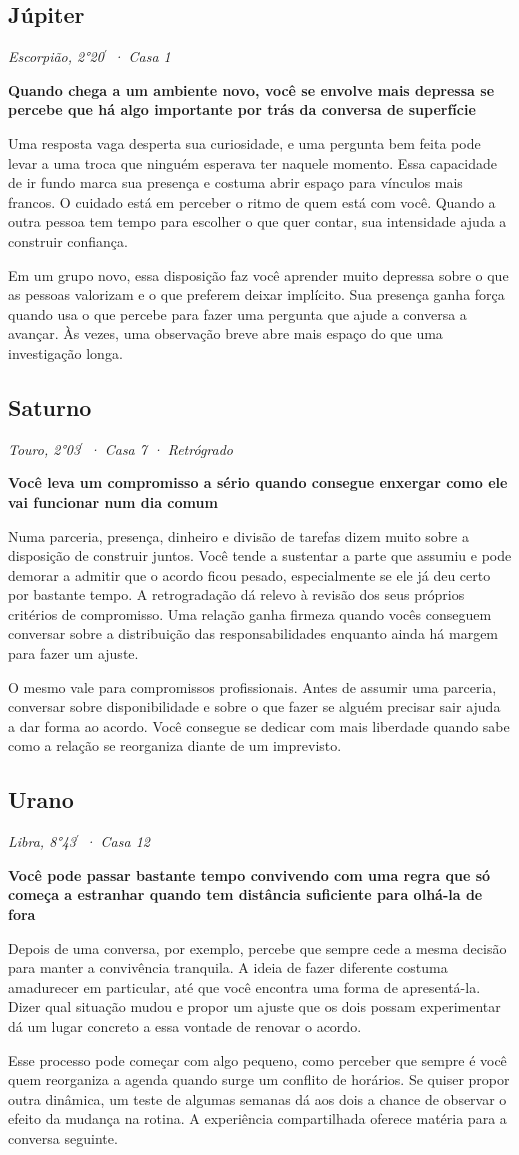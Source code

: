 \documentclass[11pt,a4paper]{article}
\newcommand{\leitura}[3]{\subsection{#1}\textit{#2}\par #3}
\newcommand{\subtituloleitura}[1]{\textbf{#1}\par\nopagebreak[4]}
\begin{document}
\leitura{Júpiter}{Escorpião, 2°20\ensuremath{^{\prime}} · Casa 1}{
\subtituloleitura{Quando chega a um ambiente novo, você se envolve mais depressa se percebe que há algo importante por trás da conversa de superfície} Uma resposta vaga desperta sua curiosidade, e uma pergunta bem feita pode levar a uma troca que ninguém esperava ter naquele momento. Essa capacidade de ir fundo marca sua presença e costuma abrir espaço para vínculos mais francos. O cuidado está em perceber o ritmo de quem está com você. Quando a outra pessoa tem tempo para escolher o que quer contar, sua intensidade ajuda a construir confiança.

Em um grupo novo, essa disposição faz você aprender muito depressa sobre o que as pessoas valorizam e o que preferem deixar implícito. Sua presença ganha força quando usa o que percebe para fazer uma pergunta que ajude a conversa a avançar. Às vezes, uma observação breve abre mais espaço do que uma investigação longa.
}

\leitura{Saturno}{Touro, 2°03\ensuremath{^{\prime}} · Casa 7 · Retrógrado}{
\subtituloleitura{Você leva um compromisso a sério quando consegue enxergar como ele vai funcionar num dia comum} Numa parceria, presença, dinheiro e divisão de tarefas dizem muito sobre a disposição de construir juntos. Você tende a sustentar a parte que assumiu e pode demorar a admitir que o acordo ficou pesado, especialmente se ele já deu certo por bastante tempo. A retrogradação dá relevo à revisão dos seus próprios critérios de compromisso. Uma relação ganha firmeza quando vocês conseguem conversar sobre a distribuição das responsabilidades enquanto ainda há margem para fazer um ajuste.

O mesmo vale para compromissos profissionais. Antes de assumir uma parceria, conversar sobre disponibilidade e sobre o que fazer se alguém precisar sair ajuda a dar forma ao acordo. Você consegue se dedicar com mais liberdade quando sabe como a relação se reorganiza diante de um imprevisto.
}

\leitura{Urano}{Libra, 8°43\ensuremath{^{\prime}} · Casa 12}{
\subtituloleitura{Você pode passar bastante tempo convivendo com uma regra que só começa a estranhar quando tem distância suficiente para olhá-la de fora} Depois de uma conversa, por exemplo, percebe que sempre cede a mesma decisão para manter a convivência tranquila. A ideia de fazer diferente costuma amadurecer em particular, até que você encontra uma forma de apresentá-la. Dizer qual situação mudou e propor um ajuste que os dois possam experimentar dá um lugar concreto a essa vontade de renovar o acordo.

Esse processo pode começar com algo pequeno, como perceber que sempre é você quem reorganiza a agenda quando surge um conflito de horários. Se quiser propor outra dinâmica, um teste de algumas semanas dá aos dois a chance de observar o efeito da mudança na rotina. A experiência compartilhada oferece matéria para a conversa seguinte.
}
\end{document}
